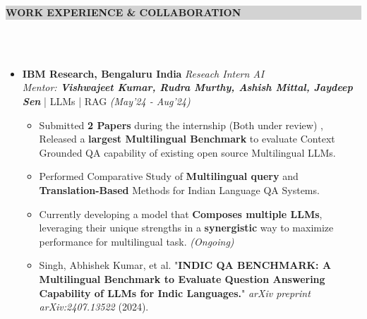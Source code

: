 \documentclass[a4paper,10.5pt]{article}
\newcommand{\lsep}{-0.5cm}
\newcommand{\resheading}[1]{{\small \colorbox{lightgray}{\begin{minipage}{0.975\textwidth}{\textbf{#1 \vphantom{p\^{E}}}}\end{minipage}}}}
\begin{document}
\resheading{\textbf{ WORK EXPERIENCE \& COLLABORATION}}\\[\lsep] \\[-0.4cm]
\vspace{0.3cm}

\begin{itemize}[noitemsep,nolistsep]
\item \textbf{IBM Research, Bengaluru India} \hfill {\emph{Reseach Intern AI}}\\
\emph{Mentor: \textbf{Vishwajeet Kumar, Rudra Murthy, Ashish Mittal, Jaydeep Sen}} | LLMs | RAG \hfill
\emph{(May'24 - Aug'24)}
\vspace{0.1cm}
\begin{itemize}[noitemsep,nolistsep]
    \item Submitted \textbf{2 Papers} during the internship (Both under review) , Released a \textbf{largest Multilingual Benchmark} to evaluate Context Grounded QA capability of existing open source Multilingual LLMs.
    \vspace{0.07cm}
    \item Performed Comparative Study of \textbf{Multilingual query} and \textbf{Translation-Based} Methods for Indian Language QA Systems.
    \vspace{0.07cm}
    \item Currently developing a model that \textbf{Composes multiple LLMs}, leveraging their unique strengths in a \textbf{synergistic} way to maximize performance for multilingual task. \textit{(Ongoing)}
    \vspace{0.07cm}
    \item Singh, Abhishek Kumar, et al. "\textbf{INDIC QA BENCHMARK: A Multilingual Benchmark to Evaluate Question Answering Capability of LLMs for Indic Languages.}" \textit{arXiv preprint arXiv:2407.13522} (2024).
\end{itemize}
\end{itemize}
\vspace{0.2cm}


\end{document}

